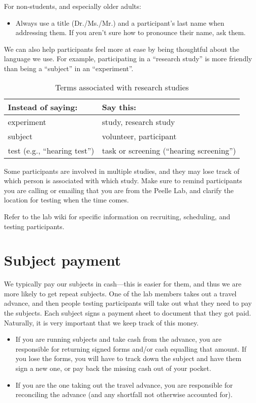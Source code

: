 \documentclass[letterpaper,12pt,oneside]{memoir}
\begin{document}
For non-students, and especially older adults:

\begin{itemize}
\item Always use a title (Dr./Ms./Mr.) and a participant's last name when addressing them. If you aren't sure how to pronounce their name, ask them.
\end{itemize}

We can also help participants feel more at ease by being thoughtful about the language we use. For example, participating in a ``research study'' is more friendly than being a ``subject'' in an ``experiment''.

\begin{table}
\centering
\caption{Terms associated with research studies}
\begin{tabular}{ll}
\toprule
Instead of saying: & Say this:\\
\midrule
experiment& study, research study\\
subject& volunteer, participant\\
test (e.g., ``hearing test'')& task or screening (``hearing screening'')\\
\bottomrule
\end{tabular}
\end{table}


Some participants are involved in multiple studies, and they may lose track of which person is associated with which study. Make sure to remind participants you are calling or emailing that you are from the Peelle Lab, and clarify the location for testing when the time comes.

Refer to the lab wiki for specific information on recruiting, scheduling, and testing participants.


\section{Subject payment}
\label{sec:subject_payment}

We typically pay our subjects in cash---this is easier for them, and thus we are more likely to get repeat subjects. One of the lab members takes out a travel advance, and then people testing participants will take out what they need to pay the subjects. Each subject signs a payment sheet to document that they got paid. Naturally, it is very important that we keep track of this money.

\begin{itemize}
\item If you are running subjects and take cash from the advance, you are responsible for returning signed forms and/or cash equalling that amount. If you lose the forms, you will have to track down the subject and have them sign a new one, or pay back the missing cash out of your pocket.
\item If you are the one taking out the travel advance, you are responsible for reconciling the advance (and any shortfall not otherwise accounted for).
\end{itemize}
\end{document}
